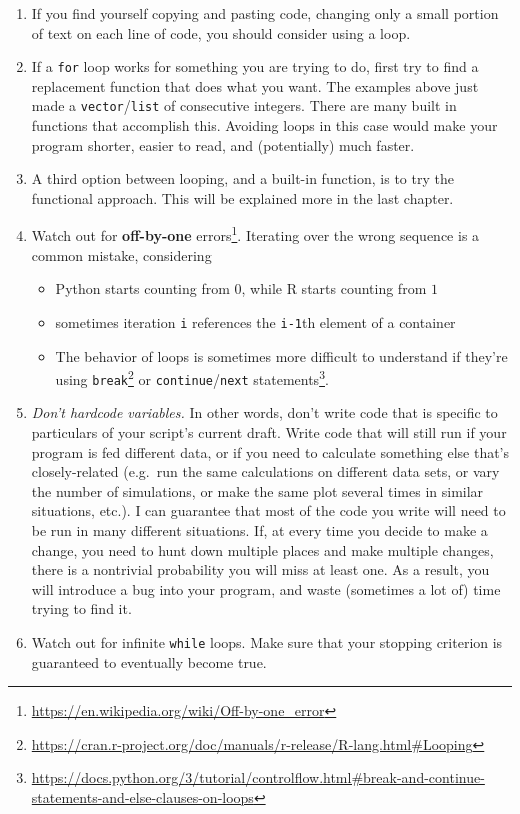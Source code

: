 \documentclass[
  12pt,
  krantz2]{krantz}
\providecommand{\tightlist}{%
  \setlength{\itemsep}{0pt}\setlength{\parskip}{0pt}}
\renewcommand{\href}[2]{#2\footnote{\url{#1}}}
\begin{document}
\begin{enumerate}
\def\labelenumi{\arabic{enumi}.}
\tightlist
\item
  If you find yourself copying and pasting code, changing only a small portion of text on each line of code, you should consider using a loop.
\item
  If a \texttt{for} loop works for something you are trying to do, first try to find a replacement function that does what you want. The examples above just made a \texttt{vector}/\texttt{list} of consecutive integers. There are many built in functions that accomplish this. Avoiding loops in this case would make your program shorter, easier to read, and (potentially) much faster.
\item
  A third option between looping, and a built-in function, is to try the functional approach. This will be explained more in the last chapter.
\item
  Watch out for \href{https://en.wikipedia.org/wiki/Off-by-one_error}{\textbf{off-by-one} errors}. Iterating over the wrong sequence is a common mistake, considering

  \begin{itemize}
  \tightlist
  \item
    Python starts counting from \(0\), while R starts counting from \(1\)
  \item
    sometimes iteration \texttt{i} references the \texttt{i-1}th element of a container
  \item
    The behavior of loops is sometimes more difficult to understand if they're using \href{https://cran.r-project.org/doc/manuals/r-release/R-lang.html\#Looping}{\texttt{break}} or \href{https://docs.python.org/3/tutorial/controlflow.html\#break-and-continue-statements-and-else-clauses-on-loops}{\texttt{continue}/\texttt{next} statements}.
  \end{itemize}
\item
  \emph{Don't hardcode variables.} In other words, don't write code that is specific to particulars of your script's current draft. Write code that will still run if your program is fed different data, or if you need to calculate something else that's closely-related (e.g.~run the same calculations on different data sets, or vary the number of simulations, or make the same plot several times in similar situations, etc.). I can guarantee that most of the code you write will need to be run in many different situations. If, at every time you decide to make a change, you need to hunt down multiple places and make multiple changes, there is a nontrivial probability you will miss at least one. As a result, you will introduce a bug into your program, and waste (sometimes a lot of) time trying to find it.
\item
  Watch out for infinite \texttt{while} loops. Make sure that your stopping criterion is guaranteed to eventually become true.
\end{enumerate}
\end{document}
